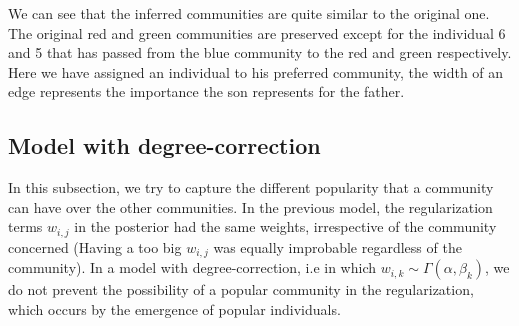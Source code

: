 \documentclass[12pt]{ociamthesis}  %
\begin{document}
	We can see that the inferred communities are quite similar to the original one. The original red and green communities are preserved except for the individual 6 and 5 that has passed from the blue community to the red and green respectively. Here we have assigned an individual to his preferred community, the width of an edge represents the importance the son represents for the father.
	\subsection{Model with degree-correction}
	
	In this subsection, we try to capture the different popularity that a community can have over the other communities. In the previous model, the regularization terms $w_{i,j}$ in the posterior had the same weights, irrespective of the community concerned (Having a too big $w_{i,j}$ was equally improbable regardless of the community). In a model with degree-correction, i.e in which $w_{i,k} \sim  \Gamma(\alpha, \beta_{k})$, we do not prevent the possibility of a popular community in the regularization, which occurs by the emergence of popular individuals.
	
\end{document}
